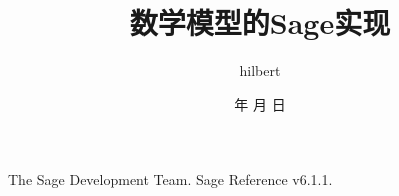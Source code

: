 \documentclass{article}
\begin{document}
\begin{CJK*}{UTF8}{gbsn}

\setlength{\parindent}{2em}
\renewcommand{\today}{\number\year 年 \number\month 月 \number\day 日}
\renewcommand{\contentsname}{目录}
\renewcommand{\refname}{参考文献}

\title{数学模型的Sage实现}
\author{hilbert}
\date{\today}
\maketitle
\newpage


\newpage

\tableofcontents
\newpage
\newpage


\newpage

\newpage

\newpage

\newpage

\newpage

\newpage

\newpage

\newpage

\newpage

\newpage

\newpage

\newpage

\newpage

\newpage

\newpage

\newpage

\newpage

\newpage

\newpage

\newpage

\newpage

\newpage

\newpage

\newpage

\newpage

\newpage

\newpage

\newpage

\newpage

\newpage

\begin{thebibliography}{99}

 The Sage Development Team.
\newblock Sage Reference v6.1.1.


\end{thebibliography}
\end{CJK*}
\end{document}
